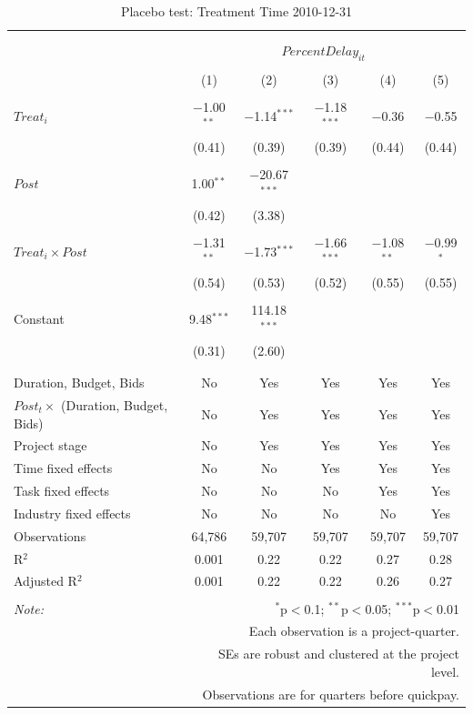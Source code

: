 \documentclass[
]{article}
\begin{document}
\begin{table}[H] \centering 
  \caption{Placebo test: Treatment Time 2010-12-31} 
  \label{} 
\small 
\begin{tabular}{@{\extracolsep{-2pt}}lccccc} 
\\[-1.8ex]\hline 
\hline \\[-1.8ex] 
\\[-1.8ex] & \multicolumn{5}{c}{$PercentDelay_{it}$} \\ 
\\[-1.8ex] & (1) & (2) & (3) & (4) & (5)\\ 
\hline \\[-1.8ex] 
 $Treat_i$ & $-$1.00$^{**}$ & $-$1.14$^{***}$ & $-$1.18$^{***}$ & $-$0.36 & $-$0.55 \\ 
  & (0.41) & (0.39) & (0.39) & (0.44) & (0.44) \\ 
  & & & & & \\ 
 $Post$ & 1.00$^{**}$ & $-$20.67$^{***}$ &  &  &  \\ 
  & (0.42) & (3.38) &  &  &  \\ 
  & & & & & \\ 
 $Treat_i \times Post$ & $-$1.31$^{**}$ & $-$1.73$^{***}$ & $-$1.66$^{***}$ & $-$1.08$^{**}$ & $-$0.99$^{*}$ \\ 
  & (0.54) & (0.53) & (0.52) & (0.55) & (0.55) \\ 
  & & & & & \\ 
 Constant & 9.48$^{***}$ & 114.18$^{***}$ &  &  &  \\ 
  & (0.31) & (2.60) &  &  &  \\ 
  & & & & & \\ 
\hline \\[-1.8ex] 
Duration, Budget, Bids & No & Yes & Yes & Yes & Yes \\ 
$Post_t \times$  (Duration, Budget, Bids) & No & Yes & Yes & Yes & Yes \\ 
Project stage & No & Yes & Yes & Yes & Yes \\ 
Time fixed effects & No & No & Yes & Yes & Yes \\ 
Task fixed effects & No & No & No & Yes & Yes \\ 
Industry fixed effects & No & No & No & No & Yes \\ 
Observations & 64,786 & 59,707 & 59,707 & 59,707 & 59,707 \\ 
R$^{2}$ & 0.001 & 0.22 & 0.22 & 0.27 & 0.28 \\ 
Adjusted R$^{2}$ & 0.001 & 0.22 & 0.22 & 0.26 & 0.27 \\ 
\hline 
\hline \\[-1.8ex] 
\textit{Note:}  & \multicolumn{5}{r}{$^{*}$p$<$0.1; $^{**}$p$<$0.05; $^{***}$p$<$0.01} \\ 
 & \multicolumn{5}{r}{Each observation is a project-quarter.} \\ 
 & \multicolumn{5}{r}{SEs are robust and clustered at the project level.} \\ 
 & \multicolumn{5}{r}{Observations are for quarters before quickpay.} \\ 
\end{tabular} 
\end{table}
\end{document}
